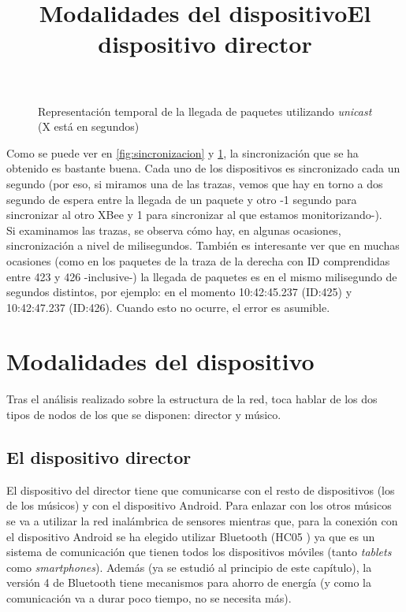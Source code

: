 \begin{figure}[!htb]
{
  }


  \caption{Representación temporal de la llegada de paquetes utilizando \textit{unicast}\\
  (X está en segundos)} \label{fig:graficasincronizados}
  \end{figure}

Como se puede ver en \ref{fig:sincronizacion} y \ref{fig:graficasincronizados},
la sincronización que se ha obtenido es bastante buena. Cada uno de los dispositivos
es sincronizado cada un segundo (por eso, si miramos una de las trazas,
vemos que hay en torno a dos segundo de espera entre la llegada de un paquete y otro
-1 segundo para sincronizar al otro XBee y 1 para sincronizar al que estamos monitorizando-).\\

Si examinamos las trazas, se observa cómo hay, en algunas ocasiones, sincronización
a nivel de milisegundos. También es interesante ver que en muchas ocasiones (como en los
paquetes de la traza de la derecha con ID comprendidas entre 423 y 426 -inclusive-) la
llegada de paquetes es en el mismo milisegundo de segundos distintos, por ejemplo: en el
momento 10:42:45.237 (ID:425) y 10:42:47.237 (ID:426). Cuando esto no ocurre, el error es asumible.\\



\section{Modalidades del dispositivo}
\title{Modalidades del dispositivo}

Tras el análisis realizado sobre la estructura de la red, toca hablar de los dos tipos
de nodos de los que se disponen: director y músico.

\subsection{El dispositivo director}
\title{El dispositivo director}

El dispositivo del director tiene que comunicarse con el resto de dispositivos (los
de los músicos) y con el dispositivo Android. Para enlazar con los otros músicos
se va a utilizar la red inalámbrica de sensores mientras que, para la conexión
con el dispositivo Android se ha elegido utilizar Bluetooth (HC05 \cite{bthc05}) ya que es un sistema
de comunicación que tienen todos los dispositivos móviles (tanto \textit{tablets} como
\textit{smartphones}). Además (ya se estudió al principio de este capítulo), la versión
4 de Bluetooth tiene mecanismos para ahorro de energía (y como la comunicación va a durar
poco tiempo, no se necesita más).\\


